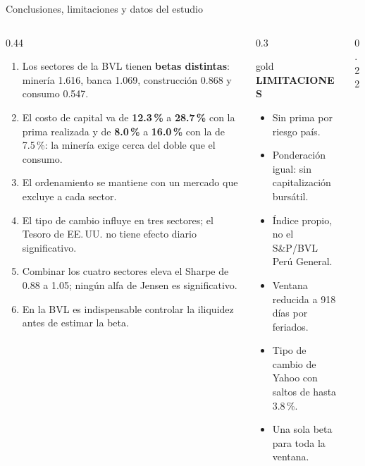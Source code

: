 \documentclass[aspectratio=169,10pt]{beamer}
\newcommand{\etiqueta}[2]{{\color{#1}\scriptsize\bfseries\MakeUppercase{#2}}\par\vspace{1mm}}
\begin{document}
\begin{frame}{Conclusiones, limitaciones y datos del estudio}
\begin{columns}[T]
\begin{column}{0.44\textwidth}
\begin{enumerate}\setlength{\itemsep}{0.8mm}\scriptsize
\item Los sectores de la BVL tienen \textbf{betas distintas}: minería 1.616, banca 1.069, construcción 0.868 y consumo 0.547.
\item El costo de capital va de \textbf{12.3\,\%} a \textbf{28.7\,\%} con la prima realizada y de \textbf{8.0\,\%} a \textbf{16.0\,\%} con la de 7.5\,\%: la minería exige cerca del doble que el consumo.
\item El ordenamiento se mantiene con un mercado que excluye a cada sector.
\item El tipo de cambio influye en tres sectores; el Tesoro de EE.\,UU. no tiene efecto diario significativo.
\item Combinar los cuatro sectores eleva el Sharpe de 0.88 a 1.05; ningún alfa de Jensen es significativo.
\item En la BVL es indispensable controlar la iliquidez antes de estimar la beta.
\end{enumerate}
\end{column}
\begin{column}{0.3\textwidth}
\begin{caja}{gold}
\etiqueta{gold!80!black}{Limitaciones}
\scriptsize
\begin{itemize}\setlength{\itemsep}{0.3mm}
\item Sin prima por riesgo país.
\item Ponderación igual: sin capitalización bursátil.
\item Índice propio, no el S\&P/BVL Perú General.
\item Ventana reducida a 918 días por feriados.
\item Tipo de cambio de Yahoo con saltos de hasta 3.8\,\%.
\item Una sola beta para toda la ventana.
\end{itemize}
\end{caja}
\end{column}
\begin{column}{0.22\textwidth}
\centering
\begin{tcolorbox}[enhanced,sharp corners,boxrule=0.6pt,colframe=linea,colback=white,halign=center,left=1.5mm,right=1.5mm,top=2mm,bottom=2mm]

\end{tcolorbox}
\end{column}
\end{columns}
\end{frame}
\end{document}

